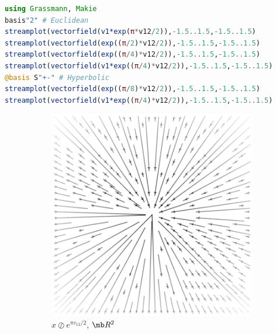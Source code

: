 \documentclass{juliacon}
\begin{document}
\begin{lstlisting}[language = Julia]
using Grassmann, Makie
basis"2" # Euclidean
streamplot(vectorfield(v1*exp(π*v12/2)),-1.5..1.5,-1.5..1.5)
streamplot(vectorfield(exp((π/2)*v12/2)),-1.5..1.5,-1.5..1.5)
streamplot(vectorfield(exp((π/4)*v12/2)),-1.5..1.5,-1.5..1.5)
streamplot(vectorfield(v1*exp((π/4)*v12/2)),-1.5..1.5,-1.5..1.5)
@basis S"+-" # Hyperbolic
streamplot(vectorfield(exp((π/8)*v12/2)),-1.5..1.5,-1.5..1.5)
streamplot(vectorfield(v1*exp((π/4)*v12/2)),-1.5..1.5,-1.5..1.5)
\end{lstlisting}
\begin{figure}[ht]
	\centering
	\begin{subfigure}[b]{0.23\textwidth}
		\includegraphics[width=\textwidth]{img/plane-1.png}
		\caption{$x\oslash e^{\pi v_{12}/2}$, $\mb R^2$}
	\end{subfigure}
	~
	\begin{subfigure}[b]{0.23\textwidth}

\end{subfigure}
\end{figure}
\end{document}
